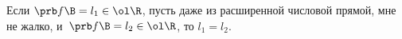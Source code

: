 
 	Если $\prb f{\B}=l_1 \in\ol\R$, пусть даже из расширенной числовой прямой, мне не жалко,
и~$\prb f{\B}=l_2 \in\ol\R$, то $l_1=l_2$. 
 